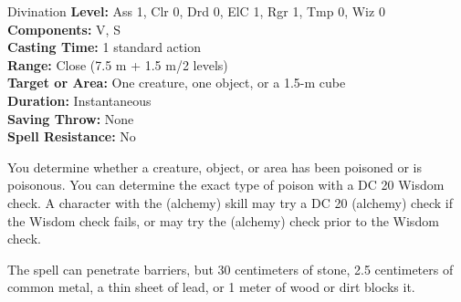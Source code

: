 {Divination}
{
	\textbf{Level:}
	Ass 1, Clr 0, Drd 0, ElC 1, Rgr 1, Tmp 0, Wiz 0\\
	\textbf{Components:}
	V, S\\
	\textbf{Casting Time:}
	1 standard action\\
	\textbf{Range:}
	Close (7.5 m + 1.5 m/2 levels)\\
	\textbf{Target or Area:}
	One creature, one object, or a 1.5-m cube\\
	\textbf{Duration:}
	Instantaneous\\
	\textbf{Saving Throw:}
	None\\
	\textbf{Spell Resistance:}
	No\\
}
{
	You determine whether a creature, object, or area has been poisoned or is poisonous. You can determine the exact type of poison with a DC 20 Wisdom check. A character with the  (alchemy) skill may try a DC 20  (alchemy) check if the Wisdom check fails, or may try the  (alchemy) check prior to the Wisdom check.

	The spell can penetrate barriers, but 30 centimeters of stone, 2.5 centimeters of common metal, a thin sheet of lead, or 1 meter of wood or dirt blocks it.

}
